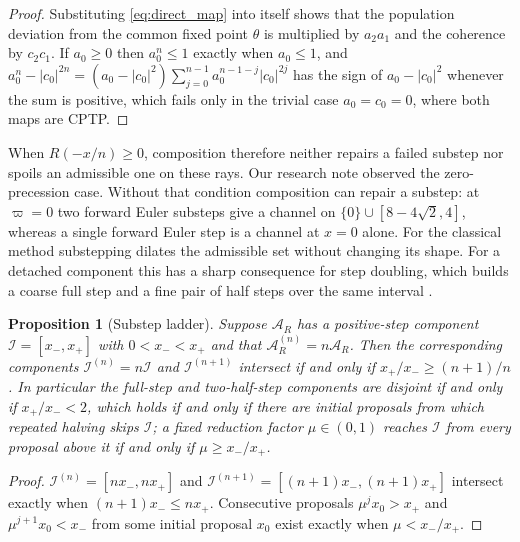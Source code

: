 \documentclass[pdflatex,sn-mathphys-num]{sn-jnl}
\newcommand{\Adm}{\mathcal A}
\theoremstyle{thmstyleone}
\newtheorem{proposition}[theorem]{Proposition}
\theoremstyle{thmstylethree}
\theoremstyle{thmstyletwo}
\begin{document}
\begin{proof}
Substituting \eqref{eq:direct_map} into itself shows that the population deviation from the common fixed point $\theta$ is multiplied by $a_2a_1$ and the coherence by $c_2c_1$. If $a_0\ge0$ then $a_0^n\le1$ exactly when $a_0\le1$, and $a_0^n-|c_0|^{2n}=(a_0-|c_0|^2)\sum_{j=0}^{n-1}a_0^{n-1-j}|c_0|^{2j}$ has the sign of $a_0-|c_0|^2$ whenever the sum is positive, which fails only in the trivial case $a_0=c_0=0$, where both maps are CPTP.
\end{proof}

When $R(-x/n)\ge0$, composition therefore neither repairs a failed substep nor spoils an admissible one on these rays. Our research note \cite{PierpointBernardLiu2026Note} observed the zero-precession case. Without that condition composition can repair a substep: at $\varpi=0$ two forward Euler substeps give a channel on $\{0\}\cup[8-4\sqrt2,4]$, whereas a single forward Euler step is a channel at $x=0$ alone. For the classical method substepping dilates the admissible set without changing its shape. For a detached component this has a sharp consequence for step doubling, which builds a coarse full step and a fine pair of half steps over the same interval \cite{Shampine1985Doubling}.

\begin{proposition}[Substep ladder]\label{prop:ladder}
Suppose $\Adm_R$ has a positive-step component $\mathcal I=[x_-,x_+]$ with $0<x_-<x_+$ and that $\Adm_R^{(n)}=n\Adm_R$. Then the corresponding components $\mathcal I^{(n)}=n\mathcal I$ and $\mathcal I^{(n+1)}$ intersect if and only if $x_+/x_-\ge(n+1)/n$. In particular the full-step and two-half-step components are disjoint if and only if $x_+/x_-<2$, which holds if and only if there are initial proposals from which repeated halving skips $\mathcal I$; a fixed reduction factor $\mu\in(0,1)$ reaches $\mathcal I$ from every proposal above it if and only if $\mu\ge x_-/x_+$.
\end{proposition}

\begin{proof}
$\mathcal I^{(n)}=[nx_-,nx_+]$ and $\mathcal I^{(n+1)}={[(n+1)x_-,(n+1)x_+]}$ intersect exactly when ${(n+1)x_-}\le nx_+$. Consecutive proposals $\mu^jx_0>x_+$ and $\mu^{j+1}x_0<x_-$ from some initial proposal $x_0$ exist exactly when $\mu<x_-/x_+$.
\end{proof}
\end{document}
